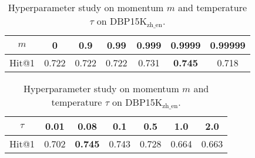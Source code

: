 \begin{table}[t]
\caption{Hyperparameter study on momentum $m$ and temperature $\tau$ on DBP15K$_{\text{zh\_en}}$.}
\centering
\begin{subtable}
    \centering
    \begin{tabular}{@{}ccccccc@{}}
        \toprule[1.5pt]
        \multicolumn{1}{c|}{$m$} &
        \multicolumn{1}{c|}{0} &
        \multicolumn{1}{c|}{0.9} &
          \multicolumn{1}{c|}{0.99} &
          \multicolumn{1}{c|}{0.999} &
          \multicolumn{1}{c|}{0.9999} &
          \multicolumn{1}{c}{0.99999}
          \\ \midrule
        \multicolumn{1}{c|}{Hit@1} &
          \multicolumn{1}{c|}{0.722} &
          \multicolumn{1}{c|}{0.722} &
          \multicolumn{1}{c|}{0.722} &
          \multicolumn{1}{c|}{0.731} &
          \multicolumn{1}{c|}{\bf 0.745} &
          \multicolumn{1}{c}{0.718} \\
        \bottomrule[1.5pt]
        \end{tabular}
\end{subtable}

\begin{subtable}
    \centering
    \begin{tabular}{@{}ccccccc@{}}
        \toprule[1.5pt]
        \multicolumn{1}{c|}{$\tau$} &
        \multicolumn{1}{c|}{0.01} &
          \multicolumn{1}{c|}{0.08} &
          \multicolumn{1}{c|}{0.1} &
          \multicolumn{1}{c|}{0.5} &
          \multicolumn{1}{c|}{1.0} &
          \multicolumn{1}{c}{2.0} \\ \midrule
        \multicolumn{1}{c|}{Hit@1} &
          \multicolumn{1}{c|}{0.702} &
          \multicolumn{1}{c|}{\bf 0.745} &
          \multicolumn{1}{c|}{0.743} &
          \multicolumn{1}{c|}{0.728} &
          \multicolumn{1}{c|}{0.664} &
          \multicolumn{1}{c}{0.663}\\
        \bottomrule[1.5pt]
        \end{tabular}
    \end{subtable}
\label{tab:param}
\end{table}